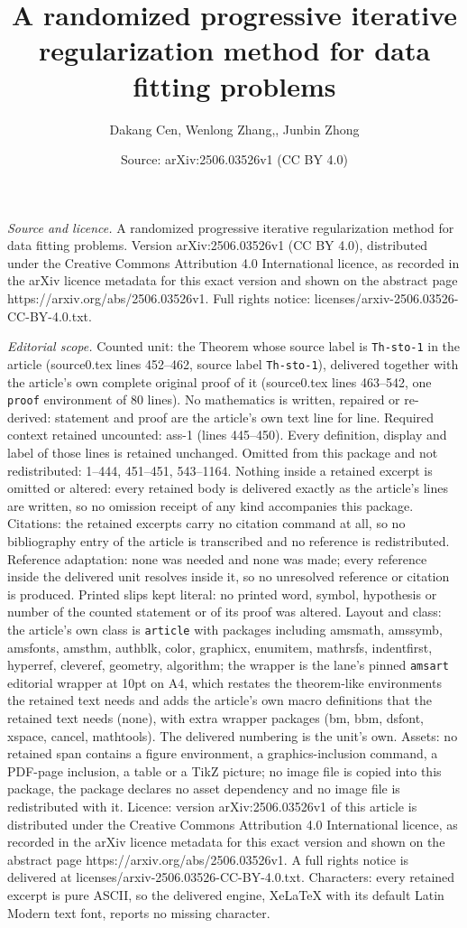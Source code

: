 \documentclass[10pt,a4paper]{amsart}
\title[A randomized progressive iterative regularization method for]{A randomized progressive iterative regularization method for data fitting problems}
\author{Dakang Cen, Wenlong Zhang,, Junbin Zhong}
\date{Source: arXiv:2506.03526v1 (CC BY 4.0)}
\begin{document}
\maketitle

\noindent\emph{Source and licence.} A randomized progressive iterative regularization method for data fitting problems. Version arXiv:2506.03526v1 (CC BY 4.0), distributed under the Creative Commons Attribution 4.0 International licence, as recorded in the arXiv licence metadata for this exact version and shown on the abstract page https://arxiv.org/abs/2506.03526v1. Full rights notice: licenses/arxiv-2506.03526-CC-BY-4.0.txt.\par\smallskip

\noindent\textit{Editorial scope.} Counted unit: the Theorem whose source label is \texttt{Th-sto-1} in the article (source0.tex lines 452--462, source label \texttt{Th-sto-1}), delivered together with the article's own complete original proof of it (source0.tex lines 463--542, one \texttt{proof} environment of 80 lines). No mathematics is written, repaired or re-derived: statement and proof are the article's own text line for line. Required context retained uncounted: ass-1 (lines 445--450). Every definition, display and label of those lines is retained unchanged. Omitted from this package and not redistributed: 1--444, 451--451, 543--1164. Nothing inside a retained excerpt is omitted or altered: every retained body is delivered exactly as the article's lines are written, so no omission receipt of any kind accompanies this package. Citations: the retained excerpts carry no citation command at all, so no bibliography entry of the article is transcribed and no reference is redistributed. Reference adaptation: none was needed and none was made; every reference inside the delivered unit resolves inside it, so no unresolved reference or citation is produced. Printed slips kept literal: no printed word, symbol, hypothesis or number of the counted statement or of its proof was altered. Layout and class: the article's own class is \texttt{article} with packages including amsmath, amssymb, amsfonts, amsthm, authblk, color, graphicx, enumitem, mathrsfs, indentfirst, hyperref, cleveref, geometry, algorithm; the wrapper is the lane's pinned \texttt{amsart} editorial wrapper at 10pt on A4, which restates the theorem-like environments the retained text needs and adds the article's own macro definitions that the retained text needs (none), with extra wrapper packages (bm, bbm, dsfont, xspace, cancel, mathtools). The delivered numbering is the unit's own. Assets: no retained span contains a figure environment, a graphics-inclusion command, a PDF-page inclusion, a table or a TikZ picture; no image file is copied into this package, the package declares no asset dependency and no image file is redistributed with it. Licence: version arXiv:2506.03526v1 of this article is distributed under the Creative Commons Attribution 4.0 International licence, as recorded in the arXiv licence metadata for this exact version and shown on the abstract page https://arxiv.org/abs/2506.03526v1. A full rights notice is delivered at licenses/arxiv-2506.03526-CC-BY-4.0.txt. Characters: every retained excerpt is pure ASCII, so the delivered engine, XeLaTeX with its default Latin Modern text font, reports no missing character.
\end{document}
